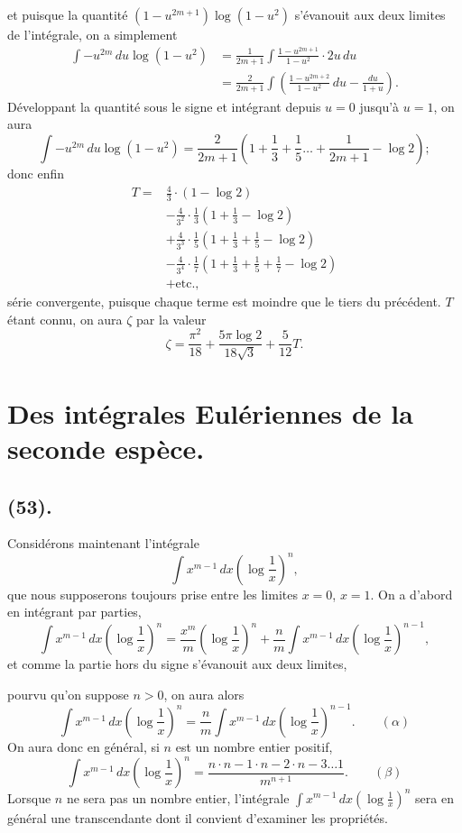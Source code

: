 \documentclass{article}
\begin{document}
et puisque la quantité $(1-u^{2m+1})\log(1-u^{2})$ s'évanouit aux deux limites de l'intégrale, on a simplement
\[ \begin{aligned} \int-u^{2m}\,du\log(1-u^{2})&=\frac{1}{2m+1}\int\frac{1-u^{2m+1}}{1-u^{2}}\cdot 2u\,du\\ &=\frac{2}{2m+1}\int\left(\frac{1-u^{2m+2}}{1-u^{2}}\,du-\frac{du}{1+u}\right). \end{aligned} \]
Développant la quantité sous le signe et intégrant depuis $u=0$ jusqu'à $u=1$, on aura
\[ \int-u^{2m}\,du\log(1-u^{2})=\frac{2}{2m+1}\left(1+\frac{1}{3}+\frac{1}{5}\ldots+\frac{1}{2m+1}-\log 2\right); \]
donc enfin
\[ \begin{aligned} T={}&\frac{4}{3}\cdot(1-\log 2)\\ &-\frac{4}{3^{2}}\cdot\frac{1}{3}\left(1+\frac{1}{3}-\log 2\right)\\ &+\frac{4}{3^{3}}\cdot\frac{1}{5}\left(1+\frac{1}{3}+\frac{1}{5}-\log 2\right)\\ &-\frac{4}{3^{4}}\cdot\frac{1}{7}\left(1+\frac{1}{3}+\frac{1}{5}+\frac{1}{7}-\log 2\right)\\ &+\text{etc.}, \end{aligned} \]
série convergente, puisque chaque terme est moindre que le tiers du précédent. $T$ étant connu, on aura $\zeta$ par la valeur
\[ \zeta=\frac{\pi^{2}}{18}+\frac{5\pi\log 2}{18\sqrt{3}}+\frac{5}{12}T. \]

\section*{Des intégrales Eulériennes de la seconde espèce.}

\subsection*{(53).}

Considérons maintenant l'intégrale
\[ \int x^{m-1}\,dx\left(\log\frac{1}{x}\right)^{n}, \]
que nous supposerons toujours prise entre les limites $x=0$, $x=1$. On a d'abord en intégrant par parties,
\[ \int x^{m-1}\,dx\left(\log\frac{1}{x}\right)^{n}=\frac{x^{m}}{m}\left(\log\frac{1}{x}\right)^{n}+\frac{n}{m}\int x^{m-1}\,dx\left(\log\frac{1}{x}\right)^{n-1}, \]
et comme la partie hors du signe s'évanouit aux deux limites,

pourvu qu'on suppose $n>0$, on aura alors
\[ \int x^{m-1}\,dx\left(\log\frac{1}{x}\right)^{n}=\frac{n}{m}\int x^{m-1}\,dx\left(\log\frac{1}{x}\right)^{n-1}.\qquad(\alpha) \]
On aura donc en général, si $n$ est un nombre entier positif,
\[ \int x^{m-1}\,dx\left(\log\frac{1}{x}\right)^{n}=\frac{n\cdot n-1\cdot n-2\cdot n-3\ldots 1}{m^{n+1}}.\qquad(\beta) \]
Lorsque $n$ ne sera pas un nombre entier, l'intégrale $\displaystyle\int x^{m-1}\,dx\left(\log\frac{1}{x}\right)^{n}$ sera en général une transcendante dont il convient d'examiner les propriétés.
\end{document}
